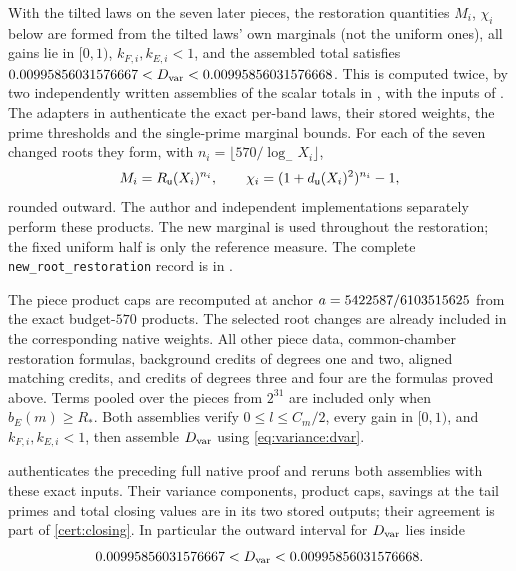\begin{certificate}\label{cert:variance:fresh}
With the tilted laws on the seven later pieces, the restoration
quantities $M_i$, $\chi_i$ below are formed from the tilted laws'
own marginals (not the uniform ones), all gains lie in $[0,1)$,
$k_{F,i},k_{E,i}<1$, and the assembled total satisfies
$0.00995856031576667<D_{\rm var}<0.00995856031576668$. This is
computed twice, by two independently written assemblies of the
scalar totals in
, with
the inputs of . The
adapters in
authenticate the exact per-band laws, their stored weights, the
prime thresholds and the single-prime marginal bounds. For each of the seven
changed roots they form, with $n_i=\lfloor570/\log_-X_i\rfloor$,
\[
 M_i=R_{\mathsf u}(X_i)^{n_i},\qquad
 \chi_i=(1+d_{\mathsf u}(X_i)^2)^{n_i}-1,
\]
rounded outward. The author and independent implementations separately
perform these products. The new marginal is used throughout the
restoration; the fixed uniform half is only the reference measure.
The complete \texttt{new\_root\_restoration} record is in
.

The piece product caps are recomputed at anchor $a=5422587/6103515625$ from the
exact budget-$570$ products. The selected root changes are already
included in the corresponding native weights. All other piece data,
common-chamber restoration formulas, background credits of degrees
one and two, aligned matching credits, and credits of degrees three
and four are the formulas proved above. Terms pooled over the
pieces from $2^{31}$ are included only when $b_E(m)\ge R_*$.
Both assemblies verify $0\le l\le C_m/2$, every gain in $[0,1)$,
and $k_{F,i},k_{E,i}<1$, then assemble $D_{\rm var}$ using
\eqref{eq:variance:dvar}.

 authenticates the preceding
full native proof and reruns both assemblies with these exact inputs.
Their variance components, product caps, savings at the tail
primes and total closing values are in its two stored outputs;
their
agreement is part of \cref{cert:closing}. In particular the outward
interval for $D_{\rm var}$ lies inside
\[
 0.00995856031576667<D_{\rm var}<0.00995856031576668.
\]
\end{certificate}

